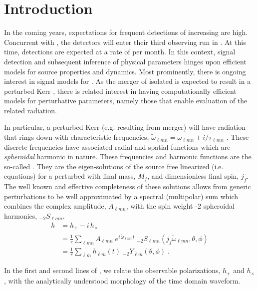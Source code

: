 \documentclass[twocolumn,aps,prd,floatfix,preprintnumbers,a4paper,nofootinbib,
superscriptaddress,10pt]{revtex4-1}
\def\check#1{\red{#1}}
\newcommand{\cw}{\tilde{\omega}}
\def\jf{j_f}
\def\mf{M_f}
\def\lmn{_{\ell m n}}
\def\LM{_{\bar{\ell} \bar{m}}}
\begin{document}
\section{Introduction}
%
In the coming years, expectations for frequent \gw{} detections of increasing \snr{} are high.
%
Concurrent with \virgo{}, the \aligo{} detectors will enter their third observing run in \check{late 2018}.
%
At this time, \bbh{} detections are expected at a rate of \check{X} per month.
%
In this context, signal detection and subsequent inference of physical parameters hinges upon efficient models for source properties and dynamics.
%
Most prominently, there is ongoing interest in signal models for \bbh{} \imr{}.
%
As the merger of isolated  is expected to result in a perturbed Kerr \bh{}, there is related interest in having computationally efficient models for perturbative parameters, namely those that enable evaluation of the related \rd{} radiation.
%
\par In particular, a perturbed Kerr \bh{} (e.g. resulting from \bbh{} merger) will have \gw{} radiation that rings down with characteristic frequencies,
%
$%
	\cw\lmn = \omega\lmn + i/\tau\lmn
$%
.
%
These discrete frequencies have associated radial and spatial functions which are \textit{spheroidal} harmonic in nature.
%
These frequencies and harmonic functions are the so-called .
%
They are the eigen-solutions of the source free linearized \ee{} (i.e.  equations) for a perturbed \bh{} with final mass, $\mf$, and dimensionless final spin, $\jf$.
%
The well known and effective completeness of these solutions allows \grad{} from generic perturbations to be well approximated by a spectral (multipolar) sum which combines the complex \qnm{} amplitude, $A\lmn$, with the spin weight -2 spheroidal harmonics, $_{-2}S\lmn$.
%
\begin{align}
	\label{hrd}
	h &= h_{+} - i \, h_{\times}
	  \\ \nonumber
	  &= \frac{1}{r} \sum\lmn A\lmn \; e^{i\,\cw\lmn t} \; _{-2}S\lmn( \jf \cw\lmn,\theta,\phi)
		\\ \nonumber
		&= \frac{1}{r} \sum\LM h\LM(t) \; _{-2}Y\LM(\theta,\phi) \;  .
\end{align}
%
\par In the first and second lines of , we relate the observable \gw{} polarizations, $h_+$ and $h_\times$, with the analytically understood morphology of the time domain waveform.
\end{document}
